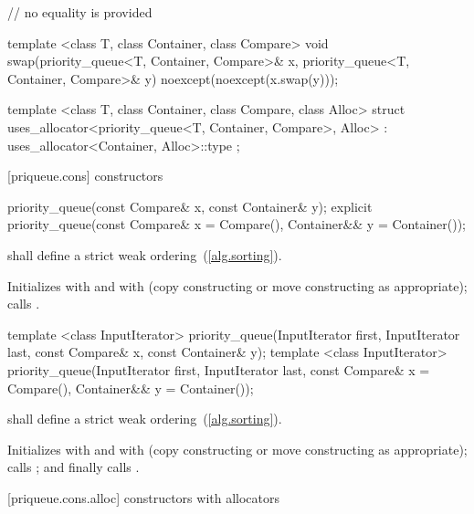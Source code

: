 \begin{codeblock}
{  // no equality is provided

  template <class T, class Container, class Compare>
    void swap(priority_queue<T, Container, Compare>& x,
              priority_queue<T, Container, Compare>& y) noexcept(noexcept(x.swap(y)));

  template <class T, class Container, class Compare, class Alloc>
    struct uses_allocator<priority_queue<T, Container, Compare>, Alloc>
      : uses_allocator<Container, Alloc>::type { };
}
\end{codeblock}

[priqueue.cons]{ constructors}

%
\begin{itemdecl}
priority_queue(const Compare& x, const Container& y);
explicit priority_queue(const Compare& x = Compare(), Container&& y = Container());
\end{itemdecl}

\begin{itemdescr}
\pnum
\requires
{} shall define a strict weak ordering~(\ref{alg.sorting}).

\pnum
\effects
Initializes
 with
 and
 with
 (copy constructing or move constructing as appropriate);
calls
.
\end{itemdescr}

%
\begin{itemdecl}
template <class InputIterator>
  priority_queue(InputIterator first, InputIterator last,
                 const Compare& x,
                 const Container& y);
template <class InputIterator>
  priority_queue(InputIterator first, InputIterator last,
                 const Compare& x = Compare(),
                 Container&& y = Container());
\end{itemdecl}

\begin{itemdescr}
\pnum
\requires
{} shall define a strict weak ordering~(\ref{alg.sorting}).

\pnum
\effects
Initializes
 with
 and
 with
 (copy constructing or move constructing as appropriate);
calls
;
and finally calls
.
\end{itemdescr}

[priqueue.cons.alloc]{ constructors with allocators}

